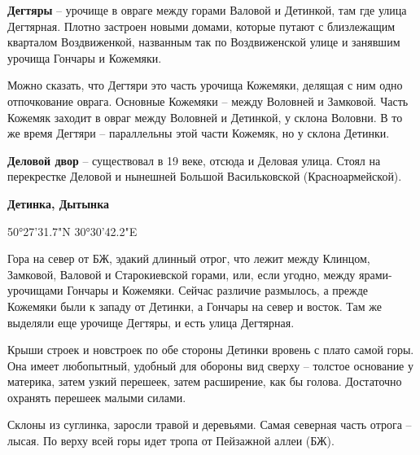 \medskip

\textbf{Дегтяры} – урочище в овраге между горами Валовой и Детинкой, там где улица Дегтярная. Плотно застроен новыми домами, которые путают с близлежащим кварталом Воздвиженкой, названным так по Воздвиженской улице и занявшим урочища Гончары и Кожемяки. 

Можно сказать, что Дегтяри это часть урочища Кожемяки, делящая с ним одно отпочкование оврага. Основные Кожемяки – между Воловней и Замковой. Часть Кожемяк заходит в овраг между Воловней и Детинкой, у склона Воловни. В то же время Дегтяри – параллельны этой части Кожемяк, но у склона Детинки.\\

\medskip

\textbf{Деловой двор} – существовал в 19 веке, отсюда и Деловая улица. Стоял на перекрестке Деловой и нынешней Большой Васильковской (Красноармейской).\\

\medskip

\textbf{Детинка, Дытынка} 

50°27'31.7"N 30°30'42.2"E


Гора на север от БЖ, эдакий длинный отрог, что лежит между Клинцом, Замковой, Валовой и Старокиевской горами, или, если угодно, между ярами-урочищами Гончары и Кожемяки. Сейчас различие размылось, а прежде Кожемяки были к  западу от Детинки, а Гончары на север и восток. Там же выделяли еще урочище Дегтяры, и есть улица Дегтярная.

Крыши строек и новстроек по обе стороны Детинки вровень с плато самой горы. Она имеет любопытный, удобный для обороны вид сверху – толстое основание у материка, затем узкий перешеек, затем расширение, как бы голова. Достаточно охранять перешеек малыми силами.

Склоны из суглинка, заросли травой и деревьями. Самая северная часть отрога – лысая. По верху всей горы идет тропа от Пейзажной аллеи (БЖ).\\ 

